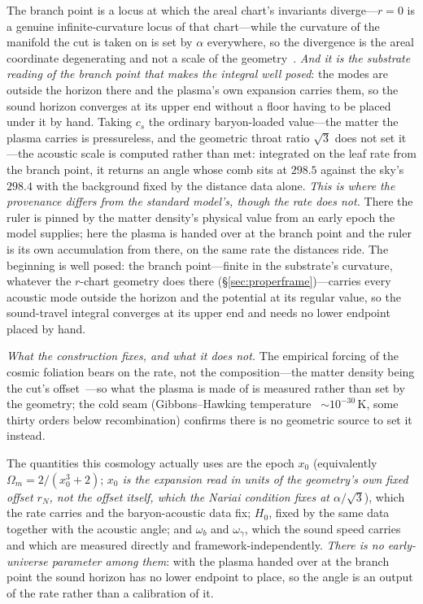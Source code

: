 \documentclass[11pt,a4paper]{article}
\theoremstyle{plain}
\theoremstyle{definition}
\theoremstyle{remark}
\begin{document}
The branch point is a locus at which the areal chart's invariants diverge---$r=0$ is
a genuine infinite-curvature locus of that chart---while the curvature of the manifold the cut is taken on is
set by $\alpha$ everywhere, so the divergence is the areal coordinate degenerating and not a scale of the
geometry~\cite{JanzenCosmogenesis, JanzenGeometricCore}. \emph{And it is the substrate reading of the branch point that makes the integral well posed}: the modes are
outside the horizon there and the plasma's own expansion carries them, so the sound horizon converges at its
upper end without a floor having to be placed under it by hand. Taking $c_s$ the ordinary baryon-loaded value---the matter the plasma carries is pressureless, and the geometric throat ratio $\sqrt3$ does not set it---the acoustic scale is computed rather than met: integrated on the leaf rate from the branch point, it returns an angle whose comb sits at $298.5$ against the sky's $298.4$ with the background fixed by the distance data alone. \emph{This is where the provenance differs from the standard model's, though the rate does not.} There the ruler is pinned by the matter density's physical value from an early epoch the model supplies; here the plasma is handed over at the branch point and the ruler is its own accumulation from there, on the same rate the distances ride. The beginning is well posed: the branch point---finite in the substrate's curvature, whatever the $r$-chart geometry does there (\S\ref{sec:properframe})---carries every acoustic mode outside the horizon and the potential at its regular value, so the sound-travel integral converges at its upper end and needs no lower endpoint placed by hand.

\emph{What the construction fixes, and what it does not.} The empirical forcing of the cosmic foliation bears on the rate, not the composition---the matter density being the cut's offset~\cite{JanzenModernParallax,JanzenOperator,JanzenRange}---so what the plasma is made of is measured rather than set by the geometry; the cold seam (Gibbons--Hawking temperature~\cite{GibbonsHawking1977} ${\sim}10^{-30}\,$K, some thirty orders below recombination) confirms there is no geometric source to set it instead. 

The quantities this cosmology actually uses are the epoch $x_{0}$ (equivalently $\Omega_m=2/(x_{0}^{3}+2)$; \emph{$x_{0}$ is the expansion read in units of the geometry's own fixed offset $r_{N}$, not the offset itself, which the Nariai condition fixes at $\alpha/\sqrt3$}), which the rate carries and the baryon-acoustic data fix; $H_{0}$, fixed by the same data together with the acoustic angle; and $\omega_b$ and $\omega_\gamma$, which the sound speed carries and which are measured directly and framework-independently. \emph{There is no early-universe parameter among them}: with the plasma handed over at the branch point the sound horizon has no lower endpoint to place, so the angle is an output of the rate rather than a calibration of it.
\end{document}

